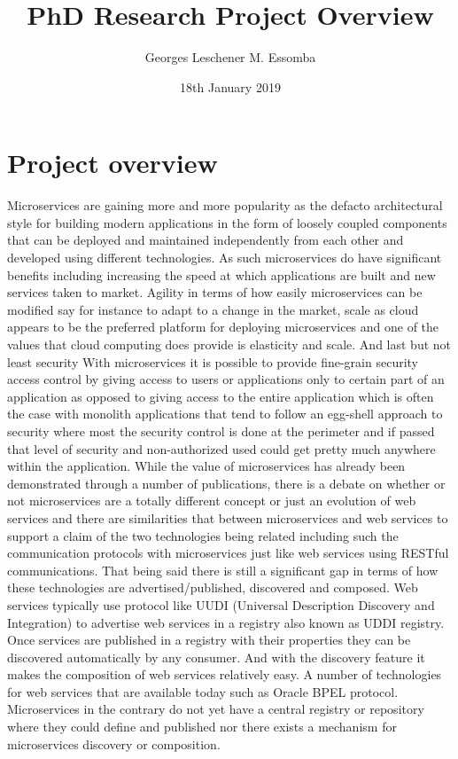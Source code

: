 \documentclass{article}
\begin{document}
\author{Georges Leschener M. Essomba}
\title{PhD Research Project Overview}
\date{18th January 2019}

\maketitle{} %

\pagebreak %
\tableofcontents %

\pagebreak %
\section{Project overview}


Microservices are gaining more and more popularity as the defacto architectural style for building modern applications in the form of loosely coupled components that can be deployed and maintained independently from each other and developed using different technologies. 
As such microservices do have significant benefits including increasing the speed at which applications are built and new services taken to market. Agility in terms of how easily microservices can be modified say for instance to adapt to a change in the market, scale as cloud appears to be the preferred platform for deploying microservices and one of the values that cloud computing does provide is elasticity and scale. And last but not least security With microservices it is possible to provide fine-grain security access control by giving access to users or applications only to certain part of an application as opposed to giving access to the entire application which is often the case with monolith applications that tend to follow an egg-shell approach to security where most the security control is done at the perimeter and if passed that level of security and non-authorized used could get pretty much anywhere within the application. While the value of microservices has already been demonstrated through a number of publications, there is a debate on whether or not microservices are a totally different concept or just an evolution of web services and there are similarities that between microservices and web services to support a claim of the two technologies being related including such the communication protocols with microservices just like web services using RESTful communications. That being said there is still a significant gap in terms of how these technologies are advertised/published, discovered and composed. Web services typically use protocol like UUDI (Universal Description Discovery and Integration) to advertise web services in a registry also known as UDDI registry. Once services are published in a registry with their properties they can be discovered automatically by any consumer. And with the discovery feature it makes the composition of web services relatively easy. A number of technologies for web services that are available today such as Oracle BPEL protocol. Microservices in the contrary do not yet have a central registry or repository where they could define and published nor there exists a mechanism for microservices discovery or composition. 
\end{document}
